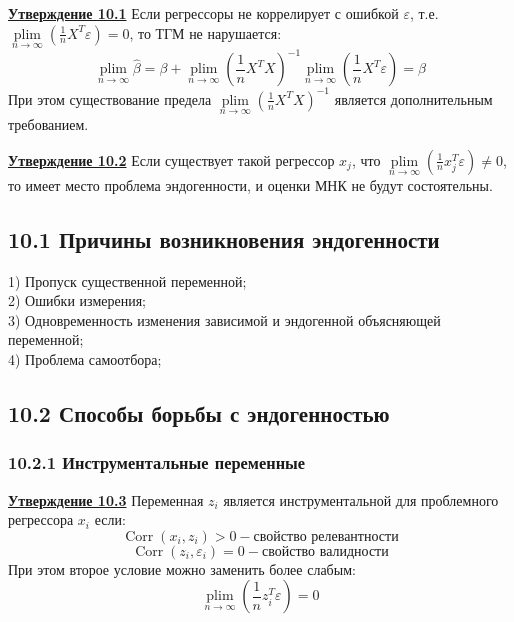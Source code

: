 \documentclass[a0,final]{a0poster}
\DeclareMathOperator{\Corr}{Corr}
\DeclareMathOperator*{\plim}{plim}
\begin{document}
\begin{multicols}{4}
\begin{tcolorbox}[colback=blue!5!white,colframe=blue!75!black]
\textbf{\underline{Утверждение 10.1}} Если регрессоры не коррелирует с ошибкой $\varepsilon$, т.е. $\plim\limits_{n \to \infty}(\frac{1}{n}X^T\varepsilon)=0$, то ТГМ не нарушается:
\[
\plim\limits_{n \to \infty}\hat{\beta}=
  \beta + \plim\limits_{n \to \infty} (\frac{1}{n}X^TX)^{-1}  \plim\limits_{n \to \infty} (\frac{1}{n}X^T\varepsilon) =
  \beta
\]
При этом существование предела $\plim\limits_{n \to \infty}(\frac{1}{n}X^TX)^{-1}$ является дополнительным требованием.
\end{tcolorbox}

\begin{tcolorbox}[colback=blue!5!white,colframe=blue!75!black]
\textbf{\underline{Утверждение 10.2}} Если существует такой регрессор $x_j$, что $\plim\limits_{n \to \infty}(\frac{1}{n}x^T_j\varepsilon) \neq 0$, то имеет место проблема эндогенности, и оценки МНК не будут состоятельны.
\end{tcolorbox}

\subsection*{\textbf{10.1 Причины возникновения эндогенности}}
1) Пропуск существенной переменной; \\
2) Ошибки измерения; \\
3) Одновременность изменения зависимой и эндогенной объясняющей переменной; \\
4) Проблема самоотбора;

\subsection*{\textbf{10.2 Способы борьбы с эндогенностью}}

\subsubsection*{\textbf{10.2.1 Инструментальные переменные}}

\begin{tcolorbox}[colback=green!5!white,colframe=green!75!black]
\textbf{\underline{Утверждение 10.3}} Переменная $z_i$ является инструментальной для проблемного регрессора $x_i$ если:
$$ \Corr(x_i,z_i) > 0  - \textit{свойство релевантности} $$
$$ \Corr(z_i,\varepsilon_i)=0  - \textit{свойство валидности} $$
При этом второе условие можно заменить более слабым:
$$\plim\limits_{n \to \infty}(\frac{1}{n}z_i^T\varepsilon) = 0$$
\end{tcolorbox}


\end{multicols}
\end{document}
